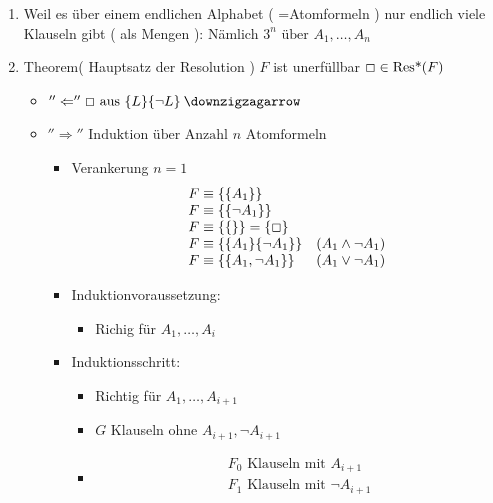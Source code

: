 \begin{enumerate}
	\item Weil es über einem endlichen Alphabet ( =Atomformeln ) nur endlich viele Klauseln gibt ( als Mengen  ): Nämlich $3^n \text{ über } A_1 , \dotsc , A_n$
	\item Theorem( Hauptsatz der Resolution ) $F$ ist unerfüllbar \gdw $\Box \in \operatorname{Res*}( F )$
	\begin{itemize}
		\item
			\begin{bew}
				$''\Leftarrow'' \Box \text{ aus } \{ L \} \{ \neg L \} \: \text{\lightning}$
			\end{bew}
		\item
			\begin{bew}
				$''\Rightarrow'' \text{ Induktion über Anzahl } n \text{ Atomformeln}$
				\begin{itemize}
					\item Verankerung $n=1$ \\
					\begin{gather*}
						\begin{array}{ l l }
							F \equiv \{ \{ A_1 \} \}									\\
							F \equiv \{ \{ \neg A_1 \} \}								\\
							F \equiv \{ \{ \} \}  = \{ \Box \}							\\
							F \equiv \{ \{ A_1 \} \{ \neg A_1 \} \}	& (A_1 \wedge \neg A_1 )	\\
							F \equiv \{ \{ A_1 , \neg A_1 \} \}		& ( A_1 \vee \neg A_1 )	
						\end{array}
					\end{gather*}
					\item Induktionvoraussetzung:
					\begin{itemize}
						\item Richig für $A_1 , \dotsc , A_i$
					\end{itemize}
					\item Induktionsschritt:
					\begin{itemize}
						\item Richtig für $A_1 , \dotsc , A_{i+1}$
						\item $G$ Klauseln ohne $A_{i+1} , \neg A_{i+1}$
						\item
							\begin{gather*}
								F_0 \text{ Klauseln mit } A_{i+1} \\
								F_1 \text{ Klauseln mit } \neg A_{i+1} \\

\end{gather*}
\end{itemize}
\end{itemize}
\end{bew}
\end{itemize}
\end{enumerate}
